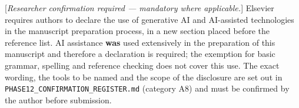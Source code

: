 \documentclass[11pt,a4paper]{article}
\theoremstyle{plain}
\theoremstyle{definition}
\theoremstyle{remark}
\begin{document}
[\emph{Researcher confirmation required --- mandatory where applicable.}] Elsevier
requires authors to declare the use of generative AI and AI-assisted
technologies in the manuscript preparation process, in a new section placed
before the reference list. AI assistance \textbf{was} used extensively in the
preparation of this manuscript and therefore a declaration is required; the
exemption for basic grammar, spelling and reference checking does not cover
this use. The exact wording, the tools to be named and the scope of the
disclosure are set out in
\texttt{PHASE12\_CONFIRMATION\_REGISTER.md} (category A8) and must be confirmed by
the author before submission.


\appendix
\setcounter{table}{0}
\renewcommand{\thetable}{\Alph{section}.\arabic{table}}





\end{document}
